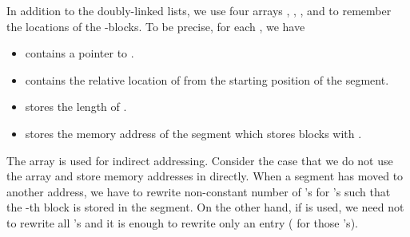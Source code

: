 \documentclass{llncs}
\begin{document}
In addition to the doubly-linked lists, we use four arrays
, , , and  to
remember the locations of the -blocks.
To be precise, for each , we have
\begin{itemize}
\item[{\raise0.3pt\hbox{}}]
 contains a pointer  to .
\item[{\raise0.3pt\hbox{}}]
 contains the relative location of 
from the starting position of the segment.
\item[{\raise0.3pt\hbox{}}]
 stores the length of .
\item[{\raise0.3pt\hbox{}}]
 stores the memory address of the segment which stores blocks
 with .
\end{itemize}
The array  is used for indirect addressing.
Consider the case that we do not use the array  and store memory addresses 
in  directly.
When a segment has moved to another address, we have to rewrite non-constant
number of 's for 's such that the -th block is stored in the segment.
On the other hand, if  is used,  we need not to rewrite all 's and
it is enough to rewrite only an entry  ( for those 's).

\medskip
\end{document}
